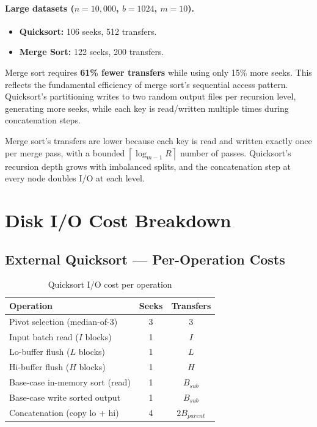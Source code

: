 \documentclass[12pt,a4paper]{article}
\newcommand{\ceil}[1]{\left\lceil #1 \right\rceil}
\begin{document}
\paragraph{Large datasets ($n = 10{,}000$, $b=1024$, $m=10$).}
\begin{itemize}[noitemsep]
  \item \textbf{Quicksort:} 106 seeks, 512 transfers.
  \item \textbf{Merge Sort:} 122 seeks, 200 transfers.
\end{itemize}
Merge sort requires \textbf{61\% fewer transfers} while using only 15\% more
seeks. This reflects the fundamental efficiency of merge sort's sequential
access pattern. Quicksort's partitioning writes to two random output files per
recursion level, generating more seeks, while each key is read/written multiple
times during concatenation steps.

Merge sort's transfers are lower because each key is read and written exactly
once per merge pass, with a bounded $\ceil{\log_{m-1} R}$ number of passes.
Quicksort's recursion depth grows with imbalanced splits, and the concatenation
step at every node doubles I/O at each level.

\section{Disk I/O Cost Breakdown}

\subsection{External Quicksort — Per-Operation Costs}

\begin{table}[H]
\centering
\caption{Quicksort I/O cost per operation}
\begin{tabular}{lcc}
\toprule
\textbf{Operation} & \textbf{Seeks} & \textbf{Transfers} \\
\midrule
Pivot selection (median-of-3) & 3 & 3 \\
Input batch read ($I$ blocks) & 1 & $I$ \\
Lo-buffer flush ($L$ blocks) & 1 & $L$ \\
Hi-buffer flush ($H$ blocks) & 1 & $H$ \\
Base-case in-memory sort (read) & 1 & $B_{sub}$ \\
Base-case write sorted output & 1 & $B_{sub}$ \\
Concatenation (copy lo + hi) & 4 & $2 B_{parent}$ \\
\bottomrule
\end{tabular}
\end{table}
\end{document}
